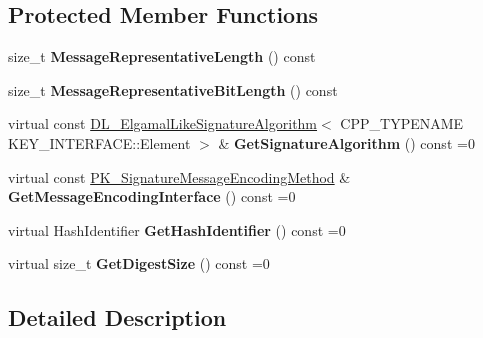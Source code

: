 \subsection*{Protected Member Functions}
\begin{DoxyCompactItemize}
\item 
\hypertarget{class_d_l___signature_scheme_base_ad92fc441759cc162b0c3fe387cac1464}{
size\_\-t {\bfseries MessageRepresentativeLength} () const }
\label{class_d_l___signature_scheme_base_ad92fc441759cc162b0c3fe387cac1464}

\item 
\hypertarget{class_d_l___signature_scheme_base_ade26acb20ca816bd219bff7dd8bab715}{
size\_\-t {\bfseries MessageRepresentativeBitLength} () const }
\label{class_d_l___signature_scheme_base_ade26acb20ca816bd219bff7dd8bab715}

\item 
\hypertarget{class_d_l___signature_scheme_base_a33b25375473e1d6a043ecd8c1f9c76d9}{
virtual const \hyperlink{class_d_l___elgamal_like_signature_algorithm}{DL\_\-ElgamalLikeSignatureAlgorithm}$<$ CPP\_\-TYPENAME KEY\_\-INTERFACE::Element $>$ \& {\bfseries GetSignatureAlgorithm} () const =0}
\label{class_d_l___signature_scheme_base_a33b25375473e1d6a043ecd8c1f9c76d9}

\item 
\hypertarget{class_d_l___signature_scheme_base_aa8176c12c649b9d22701a9645a3f0700}{
virtual const \hyperlink{class_p_k___signature_message_encoding_method}{PK\_\-SignatureMessageEncodingMethod} \& {\bfseries GetMessageEncodingInterface} () const =0}
\label{class_d_l___signature_scheme_base_aa8176c12c649b9d22701a9645a3f0700}

\item 
\hypertarget{class_d_l___signature_scheme_base_a968748c50e0e91d2730cc4a95f5ff9e1}{
virtual HashIdentifier {\bfseries GetHashIdentifier} () const =0}
\label{class_d_l___signature_scheme_base_a968748c50e0e91d2730cc4a95f5ff9e1}

\item 
\hypertarget{class_d_l___signature_scheme_base_a5a19bab3aeb3cb671de243d2627db4e3}{
virtual size\_\-t {\bfseries GetDigestSize} () const =0}
\label{class_d_l___signature_scheme_base_a5a19bab3aeb3cb671de243d2627db4e3}

\end{DoxyCompactItemize}


\subsection{Detailed Description}

